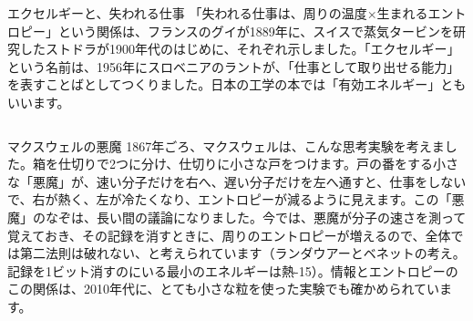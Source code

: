 \begin{column}{エクセルギーと、失われる仕事}
「失われる仕事は、周りの温度×生まれるエントロピー」という関係は、フランスのグイが1889年に、スイスで蒸気タービンを研究したストドラが1900年代のはじめに、それぞれ示しました。「エクセルギー」という名前は、1956年にスロベニアのラントが、「仕事として取り出せる能力」を表すことばとしてつくりました。日本の工学の本では「有効エネルギー」ともいいます。
\end{column}

\begin{column}{マクスウェルの悪魔}
1867年ごろ、マクスウェルは、こんな思考実験を考えました。箱を仕切りで2つに分け、仕切りに小さな戸をつけます。戸の番をする小さな「悪魔」が、速い分子だけを右へ、遅い分子だけを左へ通すと、仕事をしないで、右が熱く、左が冷たくなり、エントロピーが減るように見えます。この「悪魔」のなぞは、長い間の議論になりました。今では、悪魔が分子の速さを測って覚えておき、その記録を消すときに、周りのエントロピーが増えるので、全体では第二法則は破れない、と考えられています（ランダウアーとベネットの考え。記録を1ビット消すのにいる最小のエネルギーは熱-15）。情報とエントロピーのこの関係は、2010年代に、とても小さな粒を使った実験でも確かめられています。
\end{column}

